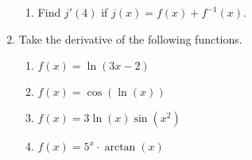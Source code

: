 \documentclass[11pt]{article}
\begin{document}
\begin{enumerate}
\begin{enumerate}
  \item Find $j'(4)$ if $j(x) = f(x) + f^{-1}(x)$.
    \vfill\vfill
    
  \end{enumerate}

\newpage

\item Take the derivative of the following functions.
  \begin{enumerate}
  \item $f(x) = \ln(3x-2) $
    \vfill
    
  \item $f(x) = \cos\left(\ln(x)\right)$
    \vfill
    
    \newpage

  \item $f(x) = 3\ln(x) \sin(x^2)$
    \vfill
    
  \item $f(x) = 5^x \cdot \arctan(x)$
    \vfill
    
  \end{enumerate}
  
  
\end{enumerate}
\end{document}
